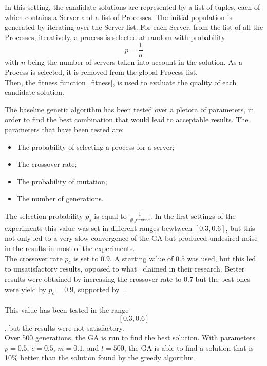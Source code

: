 In this setting, the candidate solutions are represented by a list of tuples, each of which contains a Server and a list of Processes.
The initial population is generated by iterating over the Server list. 
For each Server, from the list of all the Processes, iteratively, a process is selected at random with probability $$p = \frac{1}{n}$$
with $n$ being the number of servers taken into account in the solution. As a Process is selected, it is removed from the global Process list.\\

Then, the fitness function~\eqref{fitness}, is used to evaluate the quality of each candidate solution.

The baseline genetic algorithm has been tested over a pletora of parameters, in order to find the best combination that would lead to acceptable results.
The parameters that have been tested are:
\begin{itemize}
    \item The probability of selecting a process for a server;
    \item The crossover rate;
    \item The probability of mutation;
    \item The number of generations.
\end{itemize}

The selection probability $p_s$ is equal to $\frac{1}{\#_servers}$. In the first settings of the experiments this value was 
set in different ranges bewtween $[0.3, 0.6]$, but this not only led to a very slow convergence of the GA but produced undesired noise
in the results in most of the experiments.\\

The crossover rate $p_c$ is set to $0.9$. A starting value of $0.5$ was used, but this led to unsatisfactory results, opposed to what~\cite{mirjalili2019genetic} claimed
in their research.
Better results were obtained by increasing the crossover rate to $0.7$ but the best ones were yield by $p_c = 0.9$, supported by~\cite{hassanat2019choosing}.\\
\\

This value has been tested in the range $$[0.3, 0.6]$$, but the results were not satisfactory.\\



Over 500 generations, the GA is run to find the best solution.
With parameters $p = 0.5$, $c = 0.5$, $m = 0.1$, and $t = 500$, the GA is able to find a solution that is 10\% better than the solution found by the greedy algorithm.